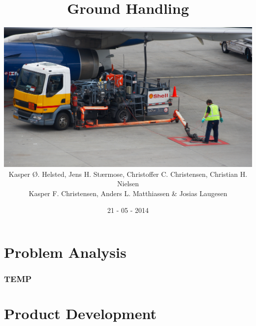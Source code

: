 \documentclass[12pt,a4paper]{report}
\title{Ground Handling}
\author{
    \includegraphics[width=14cm]{Grafik/index.jpg} \\
        Kasper Ø. Helsted, Jens H. Stærmose, Christoffer C. Christensen, Christian H. Nielsen\\
        Kasper F. Christensen, Anders L. Matthiassen \& Josias Laugesen\\
}
\date{21 - 05 - 2014}
\begin{document}
    \maketitle
    \afterpage{\null\newpage}
    \clearpage  
    
    \afterpage{\null\newpage}
    \clearpage  
    
    \tableofcontents
    \thispagestyle{empty}
    \clearpage
    \setcounter{page}{1}
    
    \part{Problem Analysis}
		
		
		
		
		
		
		
		

		
		
    
		
		
		
		
		
		
		
		
		\section{TEMP}
    
		

    \part{Product Development}
    
    \printbibliography
\end{document}
